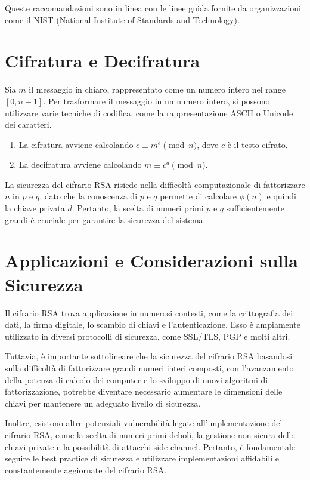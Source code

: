 \documentclass[a4paper,12pt]{report}
\begin{document}
Queste raccomandazioni sono in linea con le linee guida fornite da organizzazioni come il NIST (National Institute of Standards and Technology)\cite{nist}.

\section{Cifratura e Decifratura}
Sia $m$ il messaggio in chiaro, rappresentato come un numero intero nel range $[0, n - 1]$. Per trasformare il messaggio in un numero intero, si possono utilizzare varie tecniche di codifica, come la rappresentazione ASCII o Unicode dei caratteri.

\begin{enumerate}
    \item La cifratura avviene calcolando $c \equiv m^e \pmod{n}$, dove $c$ è il testo cifrato.
    \item La decifratura avviene calcolando $m \equiv c^d \pmod{n}$.
\end{enumerate}

La sicurezza del cifrario RSA risiede nella difficoltà computazionale di fattorizzare $n$ in $p$ e $q$, dato che la conoscenza di $p$ e $q$ permette di calcolare $\phi(n)$ e quindi la chiave privata $d$. Pertanto, la scelta di numeri primi $p$ e $q$ sufficientemente grandi è cruciale per garantire la sicurezza del sistema.

\section{Applicazioni e Considerazioni sulla Sicurezza}
Il cifrario RSA trova applicazione in numerosi contesti, come la crittografia dei dati, la firma digitale, lo scambio di chiavi e l'autenticazione. Esso è ampiamente utilizzato in diversi protocolli di sicurezza, come SSL/TLS, PGP e molti altri.

Tuttavia, è importante sottolineare che la sicurezza del cifrario RSA basandosi sulla difficoltà di fattorizzare grandi numeri interi composti, con l'avanzamento della potenza di calcolo dei computer e lo sviluppo di nuovi algoritmi di fattorizzazione, potrebbe diventare necessario aumentare le dimensioni delle chiavi per mantenere un adeguato livello di sicurezza.

Inoltre, esistono altre potenziali vulnerabilità legate all'implementazione del cifrario RSA, come la scelta di numeri primi deboli, la gestione non sicura delle chiavi private e la possibilità di attacchi side-channel. Pertanto, è fondamentale seguire le best practice di sicurezza e utilizzare implementazioni affidabili e constantemente aggiornate del cifrario RSA.
\end{document}
